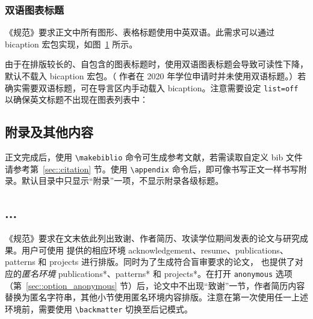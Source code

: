 \documentclass[master]{shtthesis}
\begin{document}
\subsection{双语图表标题}
《规范》要求正文中所有图形、表格标题使用中英双语。此需求可以通过 \textsf{bicaption} 宏包实现，如图~\ref{img::sht_logo} 所示。
\begin{figure}[htb]
  \centering
  \label{img::sht_logo}
\end{figure}

由于在排版较长的、自包含的图表标题时，使用双语图表标题会导致可读性下降，\shtthesis{} 默认不载入 \textsf{bicaption} 宏包。（ \shtthesis{} 作者在 2020 年学位申请时并未使用双语标题。）若确实需要双语标题，可在导言区内手动载入 \textsf{bicaption}。注意需要设定 \verb|list=off| 以确保英文标题不出现在图表列表中：
\begin{latex}
\usepackage[list=off]{bicaption}
\captionsetup[figure][bi-second]{name=Figure}
\captionsetup[table][bi-second]{name=Table}
\end{latex}

\section{附录及其他内容} \label{sec::backmatter}
正文完成后，使用 \verb|\makebiblio| 命令可生成参考文献，若需读取自定义 bib 文件请参考第~\ref{sec::citation} 节。使用 \verb|\appendix| 命令后，即可像书写正文一样书写附录。默认目录中只显示“附录”一项，不显示附录各级标题。
\begin{latex}
\appendix
\chapter{...}
\end{latex}

《规范》要求在文末依此列出致谢、作者简历、攻读学位期间发表的论文与研究成果。用户可使用 \shtthesis{} 提供的相应环境 acknowledgement、resume、publications、patterns 和 projects 进行排版。同时为了生成符合盲审要求的论文，\shtthesis{} 也提供了对应的\emph{匿名环境} publications*、patterns* 和 projects*。在打开 \verb|anonymous| 选项（第~\ref{sec::option_anonymous} 节）后，论文中不出现“致谢”一节，作者简历内容替换为匿名字符串，其他小节使用匿名环境内容排版。注意在第一次使用任一上述环境前，需要使用 \verb|\backmatter| 切换至后记模式。
\end{document}
